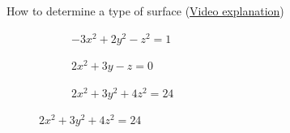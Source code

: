 \documentclass[aspectratio=169]{beamer}
\begin{document}
\begin{frame}[t]{How to determine a type of surface (\href{https://youtu.be/aM-0-oAppp0}{Video explanation})}
\begin{figure}[H]
    \begin{subfigure}{0.32\textwidth}
        \caption*{$-3x^2+2y^2-z^2=1$ \\ }
        \label{fig:1_4.png}
    \end{subfigure}
    \begin{subfigure}{0.32\textwidth}
        \caption*{$2x^2+3y-z=0$ \\ }
        \label{fig:1_5.png}
    \end{subfigure}
    \begin{subfigure}{0.32\textwidth}
        \caption*{$2x^2+3y^2+4z^2=24$ \\ }
        \label{fig:1_6.png}
    \end{subfigure}
\end{figure}
\end{frame}
\end{document}
